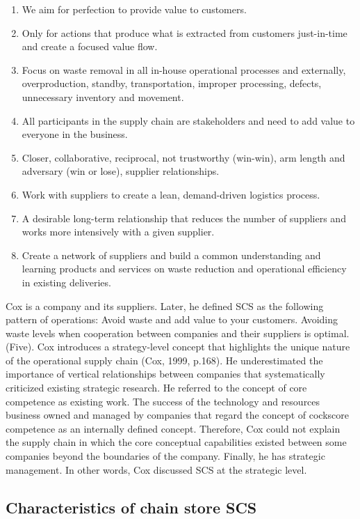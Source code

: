 \documentclass[12pt,]{article}
\begin{document}
\begin{enumerate}
\def\labelenumi{(\arabic{enumi})}
\item
  We aim for perfection to provide value to customers.
\item
  Only for actions that produce what is extracted from customers
  just-in-time and create a focused value flow.
\item
  Focus on waste removal in all in-house operational processes and
  externally, overproduction, standby, transportation, improper
  processing, defects, unnecessary inventory and movement.
\item
  All participants in the supply chain are stakeholders and need to add
  value to everyone in the business.
\item
  Closer, collaborative, reciprocal, not trustworthy (win-win), arm
  length and adversary (win or lose), supplier relationships.
\item
  Work with suppliers to create a lean, demand-driven logistics process.
\item
  A desirable long-term relationship that reduces the number of
  suppliers and works more intensively with a given supplier.
\item
  Create a network of suppliers and build a common understanding and
  learning products and services on waste reduction and operational
  efficiency in existing deliveries.
\end{enumerate}

Cox is a company and its suppliers. Later, he defined SCS as the
following pattern of operations: Avoid waste and add value to your
customers. Avoiding waste levels when cooperation between companies and
their suppliers is optimal. (Five). Cox introduces a strategy-level
concept that highlights the unique nature of the operational supply
chain (Cox, 1999, p.168). He underestimated the importance of vertical
relationships between companies that systematically criticized existing
strategic research. He referred to the concept of core competence as
existing work. The success of the technology and resources business
owned and managed by companies that regard the concept of cockscore
competence as an internally defined concept. Therefore, Cox could not
explain the supply chain in which the core conceptual capabilities
existed between some companies beyond the boundaries of the company.
Finally, he has strategic management. In other words, Cox discussed SCS
at the strategic level.

\hypertarget{characteristics-of-chain-store-scs}{%
\subsection{Characteristics of chain store
SCS}\label{characteristics-of-chain-store-scs}}
\end{document}
